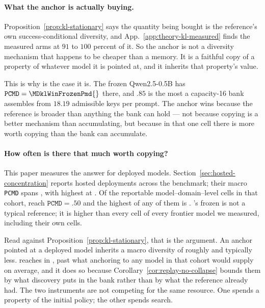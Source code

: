 \documentclass{article}
\newcommand{\1}{\mathbf 1}
\newcommand{\pmd}{\texttt{PCMD}}
\theoremstyle{remark}
\theoremstyle{definition}
\theoremstyle{plain}
\begin{document}
\paragraph{What the anchor is actually buying.}
Proposition~\ref{prop:kl-stationary} says the quantity being bought is the
reference's own success-conditional diversity, and
App.~\ref{app:theory-kl-measured} finds the measured arms at $91$ to $100$
percent of it. So the anchor is not a diversity mechanism that happens to be
cheaper than a memory. It is a faithful copy of a property of whatever model
it is pointed at, and it inherits that property's value.

This is why \MDklWinDomain{} is the case it is. The frozen Qwen2.5-0.5B has
$\pmd{}=\MDklWinFrozenPmd{}$ there, and $.85$ is the most a capacity-16 bank assembles from
$18.19$ admissible keys per prompt. The anchor wins because the reference is
broader than anything the bank can hold --- not because copying is a better
mechanism than accumulating, but because in that one cell there is more worth
copying than the bank can accumulate.

\paragraph{How often is there that much worth copying?}
This paper measures the answer for deployed models.
Section~\ref{sec:hosted-concentration} reports \MDklHostedModels{} hosted
deployments across the benchmark; their macro \pmd{} spans
\MDklHostedRange{}, with \MDklHostedHiModel{} highest at \MDklHostedHi{}. Of
the \MDklHostedCells{} reportable model--domain--level cells in that cohort,
\MDklHostedCellsHalf{} reach $\pmd{}=.50$ and the highest of any of them is
\MDklHostedCellMax{}. \MDklTopFrozenDomain{}'s frozen \MDklTopFrozenPmd{} is
not a typical reference; it is higher than every cell of every frontier model
we measured, including their own \MDklTopFrozenDomain{} cells.

Read against Proposition~\ref{prop:kl-stationary}, that is the argument. An
anchor pointed at a deployed model inherits a macro diversity of roughly
\MDklHostedHi{} and typically less. \MDklTopMemoryArm{} reaches
\MDklTopMemoryPmd{} in \MDklTopMemoryDomain{}, past what anchoring to any
model in that cohort would supply on average, and it does so because
Corollary~\ref{cor:replay-no-collapse} bounds them by what discovery puts in
the bank rather than by what the reference already had. The two instruments are
not competing for the same resource. One spends a property of the initial
policy; the other spends search.
\end{document}
